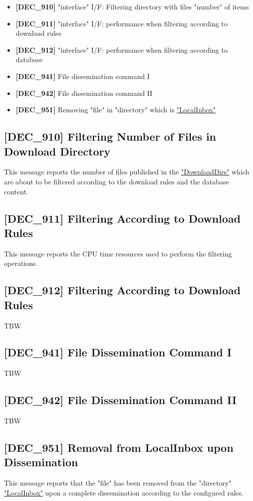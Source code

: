\documentclass[dec_sum_main.tex]{subfiles}
\begin{document}
\begin{itemize}
	\item \textbf{[DEC\_910]} "interface" I/F: Filtering directory with files "number" of items
	\item \textbf{[DEC\_911]} "interface" I/F: performance when filtering according to download rules 
	\item \textbf{[DEC\_912]} "interface" I/F: performance when filtering according to database
	\item \textbf{[DEC\_941]} File dissemination command I
	\item \textbf{[DEC\_942]} File dissemination command II	
	\item \textbf{[DEC\_951]} Removing "file" in "directory" which is \hyperref[LocalInbox]{"LocalInbox"}
\end{itemize}

\subsection{[DEC\_910] Filtering Number of Files in Download Directory}
\label{DEC910}
This message reports the number of files published in the \hyperref[DownloadDirs]{"DownloadDirs"} which are about to be filtered according to the download rules and the database content.

\subsection{[DEC\_911] Filtering According to Download Rules}
\label{DEC911}
This message reports the CPU time resources used to perform the filtering operations.

\subsection{[DEC\_912] Filtering According to Download Rules}
\label{DEC912}
TBW

\subsection{[DEC\_941] File Dissemination Command I}
\label{DEC941}
TBW

\subsection{[DEC\_942] File Dissemination Command II}
\label{DEC942}
TBW

\subsection{[DEC\_951] Removal from LocalInbox upon Dissemination}
\label{DEC951}
This message reports that the "file" has been removed from the "directory" \hyperref[LocalInbox]{"LocalInbox"} upon a complete dissemination according to the configured rules.
\end{document}
